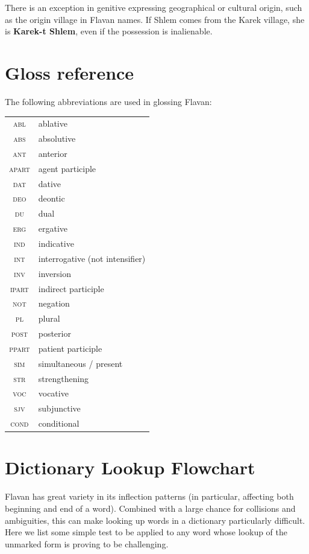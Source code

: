\documentclass[10pt,oneside]{memoir}
\newcommand{\grammar}[1]{\textsc{#1}}
\newcommand{\ERG}{\grammar{erg}}
\newcommand{\ABS}{\grammar{abs}}
\newcommand{\DAT}{\grammar{dat}}
\newcommand{\POST}{\grammar{post}}
\newcommand{\SIM}{\grammar{sim}}
\newcommand{\ANT}{\grammar{ant}}
\newcommand{\ABL}{\grammar{abl}}
\newcommand{\DEO}{\grammar{deo}}
\newcommand{\PL}{\grammar{pl}}
\newcommand{\DU}{\grammar{du}}
\newcommand{\VOC}{\grammar{voc}}
\newcommand{\INT}{\grammar{int}}
\newcommand{\NOT}{\grammar{not}}
\newcommand{\INV}{\grammar{inv}}
\newcommand{\STR}{\grammar{str}}
\newcommand{\SJV}{\grammar{sjv}}
\newcommand{\COND}{\grammar{cond}}
\newcommand{\APART}{\grammar{apart}}
\newcommand{\PPART}{\grammar{ppart}}
\newcommand{\IPART}{\grammar{ipart}}
\newcommand{\IND}{\grammar{ind}}
\begin{document}
There is an exception in genitive expressing geographical or cultural origin, such as the origin village in Flavan names. If Shlem comes from the Karek village, she is \textbf{Karek-t Shlem}, even if the possession is inalienable.



\section{Gloss reference}

The following abbreviations are used in glossing Flavan:



\begin{tabular}[]{c l}
    \ABL & ablative\\
    \ABS & absolutive\\
    \ANT & anterior\\
    \APART & agent participle\\
    \DAT & dative\\
    \DEO & deontic\\
    \DU & dual\\
    \ERG & ergative\\
    \IND & indicative\\
    \INT & interrogative (not intensifier)\\
    \INV & inversion\\
    \IPART & indirect participle\\
    \NOT & negation\\
    \PL & plural\\
    \POST & posterior\\
    \PPART & patient participle\\
    \SIM & simultaneous / present\\
    \STR & strengthening\\
    \VOC & vocative\\
    \SJV & subjunctive\\
    \COND & conditional\\
    
     
\end{tabular}


\pagebreak
\section{Dictionary Lookup Flowchart}

Flavan has great variety in its inflection patterns (in particular, affecting both beginning and end of a word). Combined with a large chance for collisions and ambiguities, this can make looking up words in a dictionary particularly difficult. Here we list some simple test to be applied to any word whose lookup of the unmarked form is proving to be challenging.
\end{document}
